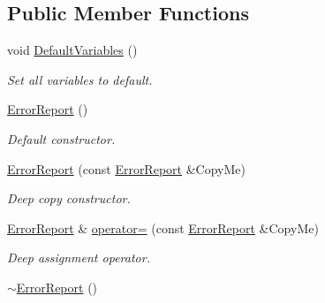 \subsection*{Public Member Functions}
\begin{DoxyCompactItemize}
\item 
\hypertarget{class_error_report_ae2719f9922f0ead483bc9f30b05a7dc2}{
void \hyperlink{class_error_report_ae2719f9922f0ead483bc9f30b05a7dc2}{DefaultVariables} ()}
\label{class_error_report_ae2719f9922f0ead483bc9f30b05a7dc2}

\begin{DoxyCompactList}\small\item\em Set all variables to default. \item\end{DoxyCompactList}\item 
\hypertarget{class_error_report_a1ce036050ec4617283eff875995ca27a}{
\hyperlink{class_error_report_a1ce036050ec4617283eff875995ca27a}{ErrorReport} ()}
\label{class_error_report_a1ce036050ec4617283eff875995ca27a}

\begin{DoxyCompactList}\small\item\em Default constructor. \item\end{DoxyCompactList}\item 
\hyperlink{class_error_report_a4e4d58c068809db565be9a61c7afcfa7}{ErrorReport} (const \hyperlink{class_error_report}{ErrorReport} \&CopyMe)
\begin{DoxyCompactList}\small\item\em Deep copy constructor. \item\end{DoxyCompactList}\item 
\hyperlink{class_error_report}{ErrorReport} \& \hyperlink{class_error_report_a8b41ce9252c9a193c14f5576c26e12d2}{operator=} (const \hyperlink{class_error_report}{ErrorReport} \&CopyMe)
\begin{DoxyCompactList}\small\item\em Deep assignment operator. \item\end{DoxyCompactList}\item 
\hypertarget{class_error_report_a6ec853c4b91e7cf38aa67e269131f06d}{
\hyperlink{class_error_report_a6ec853c4b91e7cf38aa67e269131f06d}{$\sim$ErrorReport} ()}
\label{class_error_report_a6ec853c4b91e7cf38aa67e269131f06d}


\end{DoxyCompactItemize}
